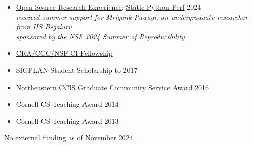\documentclass[11pt]{article}
\begin{document}

\begin{itemize}
  \item \href{https://ucsc-ospo.github.io/osre24/}{Open Source Research Experience}: \href{https://ucsc-ospo.github.io/project/osre24/uutah/static-python-perf/}{Static Python Perf} \hfill 2024
    \\ \emph{received summer support for Mrigank Pawagi, an undergraduate researcher from IIS Begaluru}
    \\ \emph{sponsored by the \href{https://www.nsf.gov/awardsearch/showAward?AWD_ID=2226407&HistoricalAwards=false}{NSF 2024 Summer of Reproducibility}}
  \item \href{https://cifellows2020.org}{CRA/CCC/NSF CI Fellowship} \hfill {}
  \item {SIGPLAN Student Scholarship to \turing{}} \hfill 2017
  \item Northeastern CCIS Graduate Community Service Award \hfill 2016
  \item Cornell CS Teaching Award \hfill 2014
  \item Cornell CS Teaching Award \hfill 2013
\end{itemize}



No external funding as of November 2024.




\end{document}
